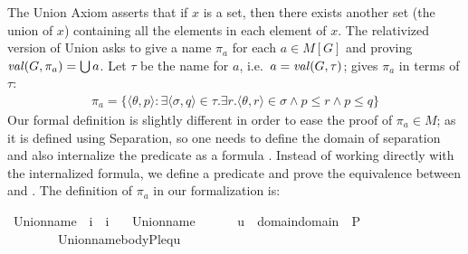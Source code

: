 The Union Axiom asserts that if $x$ is a set, then there exists
another set (the union of $x$) containing all the elements in each
element of $x$. The relativized version of Union asks to give a name
$\pi_a$ for each $a\in M[G]$ and proving $\operatorname{\mathit{val}}(G,\pi_a)=\mathop{\textstyle\bigcup} a$.
Let $\tau$ be the name for $a$, i.e.\ $a=\operatorname{\mathit{val}}(G,\tau)$; 
\citet{kunen2011set} gives $\pi_a$ in terms of $\tau$:
\begin{align*}
  \pi_a = \{\langle\theta,p \rangle :  %
\exists \langle\sigma,q\rangle  \in \tau .
 \exists r . \langle \theta,r\rangle \in \sigma \wedge
    p\leqslant r \wedge p \leqslant q \}
\end{align*}
Our formal definition is slightly different in order to ease the proof
of $\pi_a \in M$; as it is defined using Separation, so one needs to
define the domain of separation and also internalize the predicate as
a formula
. Instead of
working directly with the internalized formula, we define a predicate
 and prove the equivalence between
and
. The
definition of $\pi_a$ in our formalization is:
\begin{isabelle}
\isamarkupfalse%
\ Union{\isacharunderscore}name\ {\isacharcolon}{\isacharcolon}\ {\isachardoublequoteopen}i\ {\isasymRightarrow}\ i{\isachardoublequoteclose}\ \isanewline
\ \ {\isachardoublequoteopen}Union{\isacharunderscore}name{\isacharparenleft}{\isasymtau}{\isacharparenright}\ {\isacharequal}{\isacharequal}\ \isanewline
\ \ \ \ {\isacharbraceleft}u\ {\isasymin}\ domain{\isacharparenleft}{\isasymUnion}{\isacharparenleft}domain{\isacharparenleft}{\isasymtau}{\isacharparenright}{\isacharparenright}{\isacharparenright}\ {\isasymtimes}\ P\ {\isachardot}\isanewline
\ \ \ \  \ \ \ \ Union{\isacharunderscore}name{\isacharunderscore}body{\isacharparenleft}P{\isacharcomma}leq{\isacharcomma}{\isasymtau}{\isacharcomma}u{\isacharparenright}{\isacharbraceright}{\isachardoublequoteclose}
\end{isabelle}

